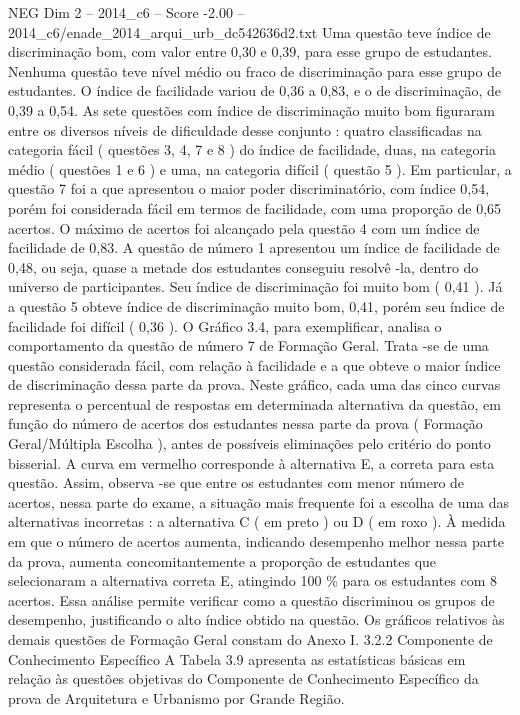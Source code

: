 \begin{textsample}{NEG Dim 2 – 2014\_c6 – Score -2.00 – 2014\_c6/enade\_2014\_arqui\_urb\_dc542636d2.txt}
Uma questão teve índice de discriminação bom, com valor entre 0,30 e 0,39, para esse grupo de estudantes.
Nenhuma questão teve nível médio ou fraco de discriminação para esse grupo de estudantes.
O índice de facilidade variou de 0,36 a 0,83, e o de discriminação, de 0,39 a 0,54.
As sete questões com índice de discriminação muito bom figuraram entre os diversos níveis de dificuldade desse conjunto : quatro classificadas na categoria fácil ( questões 3, 4, 7 e 8 ) do índice de facilidade, duas, na categoria médio ( questões 1 e 6 ) e uma, na categoria difícil ( questão 5 ).
Em particular, a questão 7 foi a que apresentou o maior poder discriminatório, com índice 0,54, porém foi considerada fácil em termos de facilidade, com uma proporção de 0,65 acertos.
O máximo de acertos foi alcançado pela questão 4 com um índice de facilidade de 0,83.
A questão de número 1 apresentou um índice de facilidade de 0,48, ou seja, quase a metade dos estudantes conseguiu resolvê -la, dentro do universo de participantes.
Seu índice de discriminação foi muito bom ( 0,41 ).
Já a questão 5 obteve índice de discriminação muito bom, 0,41, porém seu índice de facilidade foi difícil ( 0,36 ).
O Gráfico 3.4, para exemplificar, analisa o comportamento da questão de número 7 de Formação Geral.
Trata -se de uma questão considerada fácil, com relação à facilidade e a que obteve o maior índice de discriminação dessa parte da prova.
Neste gráfico, cada uma das cinco curvas representa o percentual de respostas em determinada alternativa da questão, em função do número de acertos dos estudantes nessa parte da prova ( Formação Geral/Múltipla Escolha ), antes de possíveis eliminações pelo critério do ponto bisserial.
A curva em vermelho corresponde à alternativa E, a correta para esta questão.
Assim, observa -se que entre os estudantes com menor número de acertos, nessa parte do exame, a situação mais frequente foi a escolha de uma das alternativas incorretas : a alternativa C ( em preto ) ou D ( em roxo ).
À medida em que o número de acertos aumenta, indicando desempenho melhor nessa parte da prova, aumenta concomitantemente a proporção de estudantes que selecionaram a alternativa correta E, atingindo 100 \% para os estudantes com 8 acertos.
Essa análise permite verificar como a questão discriminou os grupos de desempenho, justificando o alto índice obtido na questão.
Os gráficos relativos às demais questões de Formação Geral constam do Anexo I. 3.2.2 Componente de Conhecimento Específico A Tabela 3.9 apresenta as estatísticas básicas em relação às questões objetivas do Componente de Conhecimento Específico da prova de Arquitetura e Urbanismo por Grande Região.

\end{textsample}
